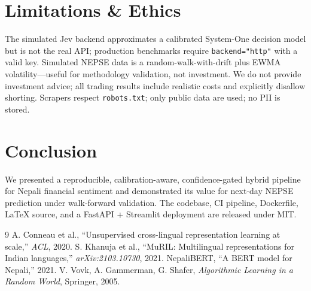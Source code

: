 \documentclass[conference]{IEEEtran}
\begin{document}
\section{Limitations \& Ethics}\label{sec:limits}
The simulated Jev backend approximates a calibrated System-One decision
model but is not the real API; production benchmarks require
\texttt{backend="http"} with a valid key. Simulated NEPSE data is a
random-walk-with-drift plus EWMA volatility---useful for methodology
validation, not investment. We do not provide investment advice; all
trading results include realistic costs and explicitly disallow shorting.
Scrapers respect \texttt{robots.txt}; only public data are used; no PII
is stored.

\section{Conclusion}\label{sec:concl}
We presented a reproducible, calibration-aware, confidence-gated hybrid
pipeline for Nepali financial sentiment and demonstrated its value for
next-day NEPSE prediction under walk-forward validation. The codebase,
CI pipeline, Dockerfile, LaTeX source, and a FastAPI + Streamlit
deployment are released under MIT.

\begin{thebibliography}{9}
 A. Conneau et al., ``Unsupervised cross-lingual representation learning at scale,'' \emph{ACL}, 2020.
 S. Khanuja et al., ``MuRIL: Multilingual representations for Indian languages,'' \emph{arXiv:2103.10730}, 2021.
 NepaliBERT, ``A BERT model for Nepali,'' 2021.
 V. Vovk, A. Gammerman, G. Shafer, \emph{Algorithmic Learning in a Random World}, Springer, 2005.
\end{thebibliography}
\end{document}
